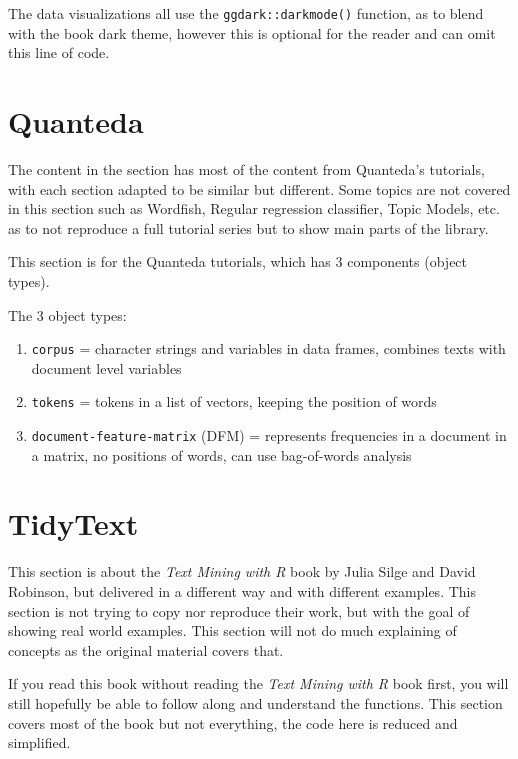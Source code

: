 \documentclass[
  letterpaper,
  DIV=11,
  numbers=noendperiod]{scrreprt}
\begin{document}
The data visualizations all use the \texttt{ggdark::darkmode()}
function, as to blend with the book dark theme, however this is optional
for the reader and can omit this line of code.


\hypertarget{quanteda}{%
\chapter{Quanteda}\label{quanteda}}

The content in the section has most of the content from Quanteda's
tutorials, with each section adapted to be similar but different. Some
topics are not covered in this section such as Wordfish, Regular
regression classifier, Topic Models, etc. as to not reproduce a full
tutorial series but to show main parts of the library.

This section is for the Quanteda tutorials, which has 3 components
(object types).

The 3 object types:

\begin{enumerate}
\def\labelenumi{\arabic{enumi}.}
\item
  \texttt{corpus} = character strings and variables in data frames,
  combines texts with document level variables
\item
  \texttt{tokens} = tokens in a list of vectors, keeping the position of
  words
\item
  \texttt{document-feature-matrix} (DFM) = represents frequencies in a
  document in a matrix, no positions of words, can use bag-of-words
  analysis
\end{enumerate}


\hypertarget{tidytext}{%
\chapter{TidyText}\label{tidytext}}

This section is about the \emph{Text Mining with R} book by Julia Silge
and David Robinson, but delivered in a different way and with different
examples. This section is not trying to copy nor reproduce their work,
but with the goal of showing real world examples. This section will not
do much explaining of concepts as the original material covers that.

If you read this book without reading the \emph{Text Mining with R} book
first, you will still hopefully be able to follow along and understand
the functions. This section covers most of the book but not everything,
the code here is reduced and simplified.
\end{document}
